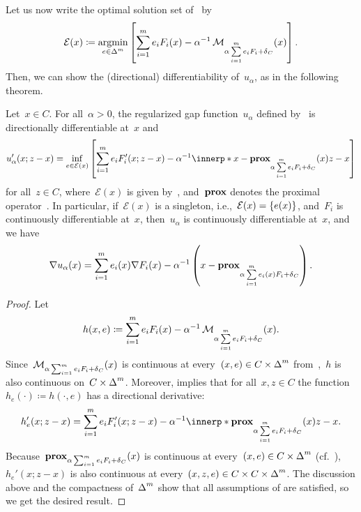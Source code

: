 \documentclass[../../main]{subfiles}
\begin{document}
Let us now write the optimal solution set of~ by
\begin{equation} \label{eq:Lambda}
    \mathcal{E}(x) \coloneqq \argmin_{e \in \simplex^m} \left[ \sum_{i = 1}^{m} e_i F_i(x) - \alpha^{-1} \envelope_{\alpha \sum\limits_{i = 1}^{m} e_i F_i + \indicator_C} (x) \right]
    .\end{equation}
Then, we can show the (directional) differentiability of~$u_\alpha$, as in the following theorem.
\begin{theorem} 
    Let~$x \in C$.
    For all~$\alpha > 0$, the regularized gap function~$u_\alpha$ defined by~ is directionally differentiable at~$x$ and
    \begin{equation}
        u_\alpha'(x; z - x) = \inf_{e \in \mathcal{E}(x)} \left[ \sum_{i = 1}^{m} e_i F_i'(x; z - x) - \alpha^{-1} \innerp*{x - \prox_{\alpha \sum\limits_{i = 1}^{m} e_i F_i + \indicator_C}(x)}{z - x} \right]
    \end{equation}
    for all~$z \in C$, where~$\mathcal{E}(x)$ is given by~, and~$\prox$ denotes the proximal operator~.
    In particular, if~$\mathcal{E}(x)$ is a singleton, i.e.,~$\mathcal{E}(x) = \set*{e(x)}$, and~$F_i$ is continuously differentiable at~$x$, then~$u_\alpha$ is continuously differentiable at~$x$, and we have
    \begin{equation}
        \nabla u_\alpha(x) = \sum_{i = 1}^{m} e_i(x) \nabla F_i(x) - \alpha^{-1} \left( x - \prox_{\alpha \sum\limits_{i = 1}^{m} e_i(x) F_i + \indicator_C} \right)
        .\end{equation}
\end{theorem}
\begin{proof}
    Let
    \begin{equation}
        h(x, e) \coloneqq \sum_{i = 1}^{m} e_i F_i(x) - \alpha^{-1} \envelope_{\alpha \sum\limits_{i = 1}^{m} e_i F_i + \indicator_C} (x)
        .\end{equation}
    Since~$\envelope_{\alpha \sum_{i = 1}^{m} e_i F_i + \indicator_C} (x)$ is continuous at every~$(x, e) \in C \times \simplex^m$ from~\cite[Theorem~7.37]{Rockafellar1998},~$h$ is also continuous on~$C \times \simplex^m$.
    Moreover,  implies that for all~$x, z \in C$ the function~$h_e(\cdot) \coloneqq h(\cdot, e)$ has a directional derivative:
    \begin{equation}
        h_e'(x; z - x) = \sum_{i = 1}^{m} e_i F_i'(x; z - x) - \alpha^{-1} \innerp*{\prox_{\alpha \sum\limits_{i = 1}^{m} e_i F_i + \indicator_C}(x)}{z - x}
        .\end{equation}
    Because~$\prox_{\alpha \sum_{i = 1}^{m} e_i F_i + \indicator_C} (x)$ is continuous at every~$(x, e) \in C \times \simplex^m$ (cf.~\cite[Exercise~7.38]{Rockafellar1998}),~$h_e'(x; z - x)$ is also continuous at every~$(x, z, e) \in C \times C \times \simplex^m$.
    The discussion above and the compactness of~$\simplex^m$ show that all assumptions of  are satisfied, so we get the desired result.
\end{proof}
\end{document}
